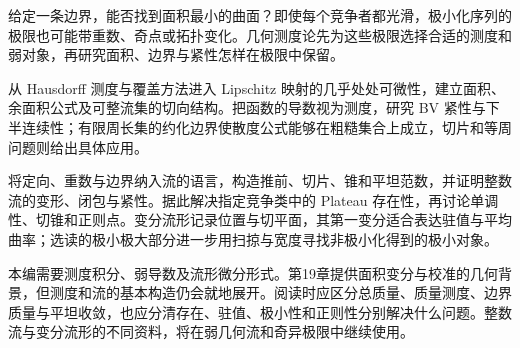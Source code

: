 
% 

\BookPartGuide
给定一条边界，能否找到面积最小的曲面？即使每个竞争者都光滑，极小化序列的极限也可能带重数、奇点或拓扑变化。几何测度论先为这些极限选择合适的测度和弱对象，再研究面积、边界与紧性怎样在极限中保留。

\ProseParagraphBreak
{}从 Hausdorff 测度与覆盖方法进入 Lipschitz 映射的几乎处处可微性，建立面积、余面积公式及可整流集的切向结构。把函数的导数视为测度，研究 BV 紧性与下半连续性；有限周长集的约化边界使散度公式能够在粗糙集合上成立，切片和等周问题则给出具体应用。

\ProseParagraphBreak
{}将定向、重数与边界纳入流的语言，构造推前、切片、锥和平坦范数，并证明整数流的变形、闭包与紧性。据此解决指定竞争类中的 Plateau 存在性，再讨论单调性、切锥和正则点。变分流形记录位置与切平面，其第一变分适合表达驻值与平均曲率；选读的极小极大部分进一步用扫掠与宽度寻找非极小化得到的极小对象。

\ProseParagraphBreak
本编需要测度积分、弱导数及流形微分形式。第19章提供面积变分与校准的几何背景，但测度和流的基本构造仍会就地展开。阅读时应区分总质量、质量测度、边界质量与平坦收敛，也应分清存在、驻值、极小性和正则性分别解决什么问题。整数流与变分流形的不同资料，将在弱几何流和奇异极限中继续使用。






